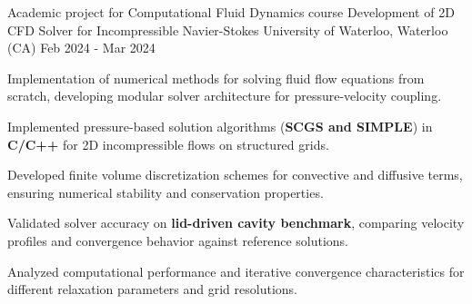 
\cventry
{Academic project for Computational Fluid Dynamics course}
{Development of 2D CFD Solver for Incompressible Navier-Stokes}
{University of Waterloo, Waterloo (CA)}
{Feb 2024 - Mar 2024}
{
    Implementation of numerical methods for solving fluid flow equations from scratch, developing modular solver architecture for pressure-velocity coupling.
    \newline
    \vspace{4mm}
    \begin{cvitems}
        \item {Implemented pressure-based solution algorithms (\textbf{SCGS and SIMPLE}) in \textbf{C/C++} for 2D incompressible flows on structured grids.}
        \item {Developed finite volume discretization schemes for convective and diffusive terms, ensuring numerical stability and conservation properties.}
        \item {Validated solver accuracy on \textbf{lid-driven cavity benchmark}, comparing velocity profiles and convergence behavior against reference solutions.}
        \item {Analyzed computational performance and iterative convergence characteristics for different relaxation parameters and grid resolutions.}
    \end{cvitems}
}
